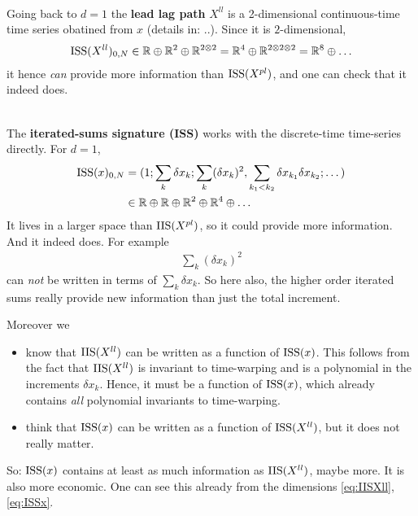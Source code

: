 \documentclass{scrartcl}
\theoremstyle{plain}
\theoremstyle{definition}
\newcommand{\R}{\mathbb{R}}
\begin{document}
~\\

Going back to $d=1$ the \textbf{lead lag path} $X^{ll}$ is a 2-dimensional continuous-time time series obatined from $x$
(details in: ..).
Since it is $2$-dimensional, 
\begin{align}
  \label{eq:IISXll}
  \ISS( X^{ll} )_{0,N} \in \R \oplus \R^{2} \oplus \R^{2\otimes2} = \R^4 \oplus \R^{2\otimes 2\otimes 2} = \R^8 \oplus \dots
\end{align}
it hence \emph{can} provide more information than $\operatorname{ISS}(X^{pl})$,
and one can check that it indeed does.

~\\

The \textbf{iterated-sums signature (ISS)} works with the discrete-time time-series directly.
For $d=1$,
\begin{align}
  \ISS(x)_{0,N}
  &= (1;\sum_{k} \delta x_k; \sum_{k} (\delta x_k)^2, \sum_{k_1<k_2} \delta x_{k_1} \delta x_{k_2}; \dots) \notag \\
  &\in \R \oplus \R \oplus \R^2 \oplus \R^4 \oplus \dots
  \label{eq:ISSx}
\end{align}
It lives in a larger space than $\operatorname{IIS}(X^{pl})$, so it could provide more information.
And it indeed does.
For example
\begin{align*}
  \sum_{k} (\delta x_k)^2
\end{align*}
can \emph{not} be written in terms of $\sum_k \delta x_k$.
So here also, the higher order iterated sums really provide new information than just the total increment.

Moreover we
\begin{itemize}
  \item know that $\operatorname{IIS}( X^{ll} )$ can be written as a function of $\operatorname{ISS}( x )$.
    This follows from the fact that $\operatorname{IIS}( X^{ll} )$ is invariant to time-warping and is a polynomial in the increments $\delta x_k$.
    Hence, it must be a function of $\operatorname{ISS}(x)$, which already contains \emph{all} polynomial invariants to time-warping.

  \item think that $\operatorname{ISS}( x )$ can be written as a function of $\operatorname{ISS}( X^{ll} )$, but it does not really matter.
\end{itemize}

So: $\operatorname{ISS}(x)$ contains at least as much information as $\operatorname{IIS}( X^{ll} )$, maybe more.
It is also more economic.
One can see this already from the dimensions \eqref{eq:IISXll}, \eqref{eq:ISSx}.
\end{document}
